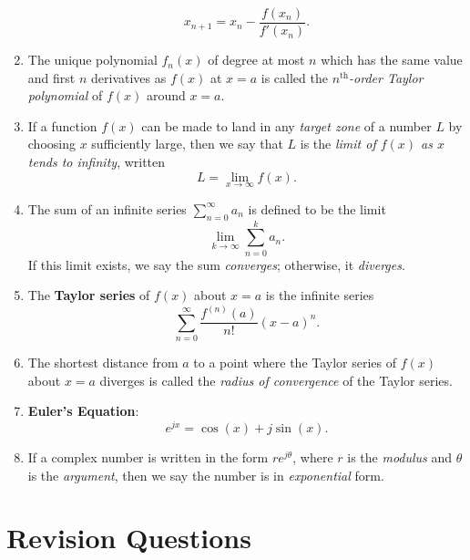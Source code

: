 \documentclass{article}
\begin{document}
\begin{enumerate}
		\[x_{n+1} = x_n -\frac{f(x_n)}{f'(x_n)}.\]
	\item The unique polynomial $f_n(x)$ of degree at most $n$ which has the same value and first $n$ derivatives as $f(x)$ at $x=a$ is called the $n^\mathrm{th}$\textit{-order Taylor polynomial} of $f(x)$ around $x=a$.
	\item If a function $f(x)$ can be made to land in any \textit{target zone} of a number $L$ by choosing $x$ sufficiently large, then we say that $L$ is the \textit{limit of $f(x)$ as $x$ tends to infinity}, written
		\[L=\lim_{x\to \infty}f(x).\]
	\item The sum of an infinite series $\sum\limits_{n=0}^\infty a_n$ is defined to be the limit
		\[\lim_{k\to \infty}\sum_{n=0}^k a_n.\]
		If this limit exists, we say the sum \textit{converges}; otherwise, it \textit{diverges}.
	\item The \textbf{Taylor series} of $f(x)$ about $x=a$ is the infinite series
		\[\sum_{n=0}^\infty \frac{f^{(n)}(a)}{n!}(x-a)^n.\]
	\item The shortest distance from $a$ to a point where the Taylor series of $f(x)$ about $x=a$ diverges is called the \textit{radius of convergence} of the Taylor series.
	\item \textbf{Euler's Equation}:
		\[e^{jx}=\cos(x)+j\sin(x).\]
	\item If a complex number is written in the form $re^{j\theta}$, where $r$ is the \textit{modulus} and $\theta$ is the \textit{argument}, then we say the number is in \textit{exponential} form.
\end{enumerate}










\clearpage

\section{Revision Questions}
\end{document}
